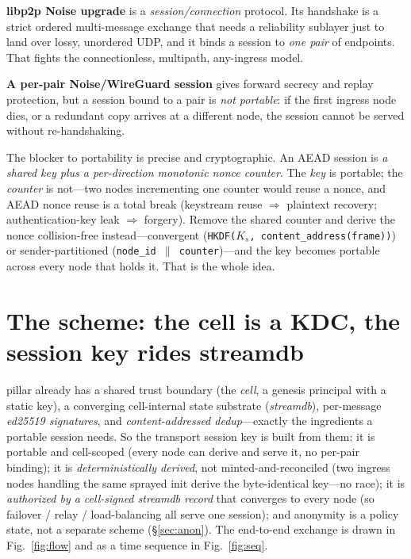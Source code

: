 \documentclass[10pt,twocolumn]{article}
\newcommand{\code}[1]{\texttt{\small #1}}
\newcommand{\Ks}{\ensuremath{K_s}}
\begin{document}
\textbf{libp2p Noise upgrade} is a \emph{session/connection} protocol. Its
handshake is a strict ordered multi-message exchange that needs a reliability
sublayer just to land over lossy, unordered UDP, and it binds a session to
\emph{one pair} of endpoints. That fights the connectionless, multipath,
any-ingress model.

\textbf{A per-pair Noise/WireGuard session} gives forward secrecy and replay
protection, but a session bound to a pair is \emph{not portable}: if the first
ingress node dies, or a redundant copy arrives at a different node, the session
cannot be served without re-handshaking.

The blocker to portability is precise and cryptographic. An AEAD session is
\emph{a shared key plus a per-direction monotonic nonce counter}. The \emph{key}
is portable; the \emph{counter} is not---two nodes incrementing one counter would
reuse a nonce, and AEAD nonce reuse is a total break (keystream reuse
$\Rightarrow$ plaintext recovery; authentication-key leak $\Rightarrow$ forgery).
Remove the shared counter and derive the nonce collision-free instead---convergent
(\code{HKDF(\Ks, content\_address(frame))}) or sender-partitioned
(\code{node\_id\,\(\|\)\,counter})---and the key becomes portable across every node
that holds it. That is the whole idea.

\section{The scheme: the cell is a KDC, the session key rides streamdb}
pillar already has a shared trust boundary (the \emph{cell}, a genesis principal
with a static key), a converging cell-internal state substrate (\emph{streamdb}),
per-message \emph{ed25519 signatures}, and \emph{content-addressed dedup}---exactly
the ingredients a portable session needs. So the transport session key is built
from them: it is portable and cell-scoped (every node can derive and serve it, no
per-pair binding); it is \emph{deterministically derived}, not
minted-and-reconciled (two ingress nodes handling the same sprayed init derive the
byte-identical key---no race); it is \emph{authorized by a cell-signed streamdb
record} that converges to every node (so failover / relay / load-balancing all
serve one session); and anonymity is a policy state, not a separate scheme
(\S\ref{sec:anon}). The end-to-end exchange is drawn in Fig.~\ref{fig:flow}
and as a time sequence in Fig.~\ref{fig:seq}.
\end{document}
